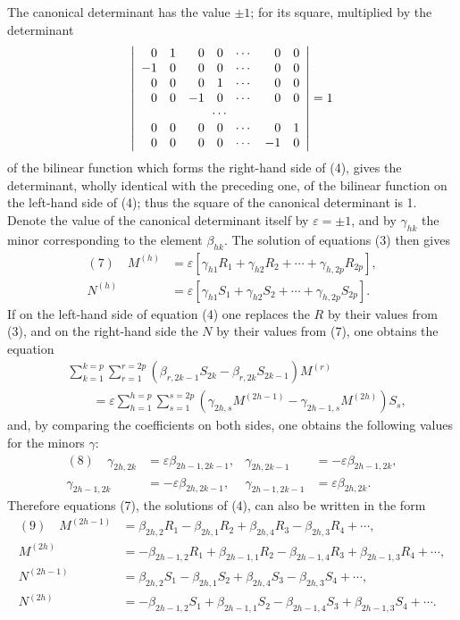 \documentclass[10pt]{article}
\begin{document}
The canonical determinant has the value \(\pm1\); for its square, multiplied by the determinant
\[
\left|
\begin{array}{rrrrrrr}
0&1&0&0&\cdots&0&0\\
-1&0&0&0&\cdots&0&0\\
0&0&0&1&\cdots&0&0\\
0&0&-1&0&\cdots&0&0\\
\multicolumn{7}{c}{\cdots}\\
0&0&0&0&\cdots&0&1\\
0&0&0&0&\cdots&-1&0
\end{array}
\right|=1
\]
of the bilinear function which forms the right-hand side of (4), gives the determinant, wholly identical with the preceding one, of the bilinear function on the left-hand side of (4); thus the square of the canonical determinant is 1. Denote the value of the canonical determinant itself by \(\varepsilon=\pm1\), and by \(\gamma_{hk}\) the minor corresponding to the element \(\beta_{hk}\). The solution of equations (3) then gives
\[
\begin{aligned}
(7)\quad
M^{(h)}&=\varepsilon[\gamma_{h1}R_1+\gamma_{h2}R_2+\cdots+\gamma_{h,2p}R_{2p}],\\
N^{(h)}&=\varepsilon[\gamma_{h1}S_1+\gamma_{h2}S_2+\cdots+\gamma_{h,2p}S_{2p}].
\end{aligned}
\]
If on the left-hand side of equation (4) one replaces the \(R\) by their values from (3), and on the right-hand side the \(N\) by their values from (7), one obtains the equation
\[
\begin{aligned}
&\sum_{k=1}^{k=p}\sum_{r=1}^{r=2p}(\beta_{r,2k-1}S_{2k}-\beta_{r,2k}S_{2k-1})M^{(r)}\\
&\hspace{2em}=\varepsilon\sum_{h=1}^{h=p}\sum_{s=1}^{s=2p}
(\gamma_{2h,s}M^{(2h-1)}-\gamma_{2h-1,s}M^{(2h)})S_s,
\end{aligned}
\]
and, by comparing the coefficients on both sides, one obtains the following values for the minors \(\gamma\):
\[
\begin{array}{rlrl}
(8)\quad
\gamma_{2h,2k}&=\varepsilon\beta_{2h-1,2k-1},&
\gamma_{2h,2k-1}&=-\varepsilon\beta_{2h-1,2k},\\
\gamma_{2h-1,2k}&=-\varepsilon\beta_{2h,2k-1},&
\gamma_{2h-1,2k-1}&=\varepsilon\beta_{2h,2k}.
\end{array}
\]
Therefore equations (7), the solutions of (4), can also be written in the form
\[
\begin{aligned}
(9)\quad
M^{(2h-1)}&=\beta_{2h,2}R_1-\beta_{2h,1}R_2+\beta_{2h,4}R_3-\beta_{2h,3}R_4+\cdots,\\
M^{(2h)}&=-\beta_{2h-1,2}R_1+\beta_{2h-1,1}R_2-\beta_{2h-1,4}R_3+\beta_{2h-1,3}R_4+\cdots,\\
N^{(2h-1)}&=\beta_{2h,2}S_1-\beta_{2h,1}S_2+\beta_{2h,4}S_3-\beta_{2h,3}S_4+\cdots,\\
N^{(2h)}&=-\beta_{2h-1,2}S_1+\beta_{2h-1,1}S_2-\beta_{2h-1,4}S_3+\beta_{2h-1,3}S_4+\cdots.
\end{aligned}
\]
\end{document}
